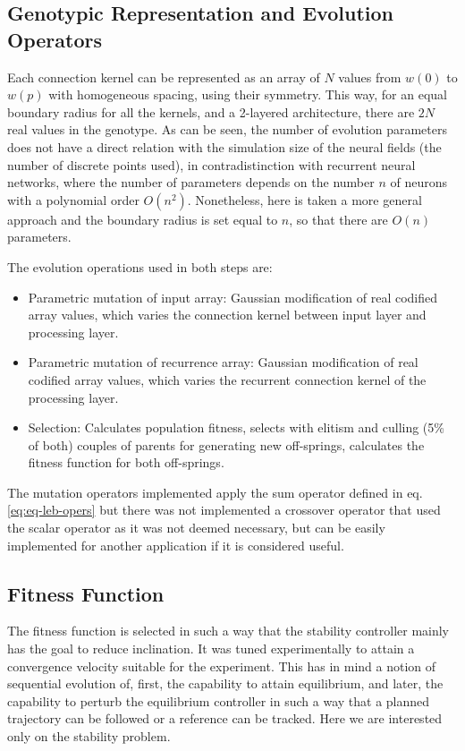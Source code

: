 \subsection{Genotypic Representation and Evolution Operators}
Each connection kernel can be represented as an array of $N$ values
from $w(0)$ to $w(p)$ with homogeneous spacing, using their
symmetry. This way, for an equal boundary radius for all the kernels,
and a 2-layered architecture, there are $2N$ real values in the
genotype. As can be seen, the number of evolution parameters does not
have a direct relation with the simulation size of the neural fields
(the number of discrete points used), in contradistinction with
recurrent neural networks, where the number of parameters depends on
the number $n$ of neurons with a polynomial order
$O(n^2)$. Nonetheless, here is taken a more general approach and the
boundary radius is set equal to $n$, so that there are $O(n)$
parameters.

The evolution operations used in both steps are:
\begin{itemize}
\item Parametric mutation of input array: Gaussian modification of
  real codified array values, which varies the connection kernel
  between input layer and processing layer.
\item Parametric mutation of recurrence array: Gaussian modification
  of real codified array values, which varies the recurrent connection
  kernel of the processing layer.
\item Selection: Calculates population fitness, selects with elitism
  and culling (5\% of both) couples of parents for generating new
  off-springs, calculates the fitness function for both off-springs.
\end{itemize}

The mutation operators implemented apply the sum operator defined in
eq. \ref{eq:eq-leb-opers} but there was not implemented a crossover
operator that used the scalar operator as it was not deemed necessary,
but can be easily implemented for another application if it is
considered useful.

\subsection{Fitness Function}
The fitness function is selected in such a way that the stability
controller mainly has the goal to reduce inclination. It was tuned
experimentally to attain a convergence velocity suitable for the
experiment. This has in mind a notion of sequential evolution of,
first, the capability to attain equilibrium, and later, the capability
to perturb the equilibrium controller in such a way that a planned
trajectory can be followed or a reference can be tracked. Here we are
interested only on the stability problem.

